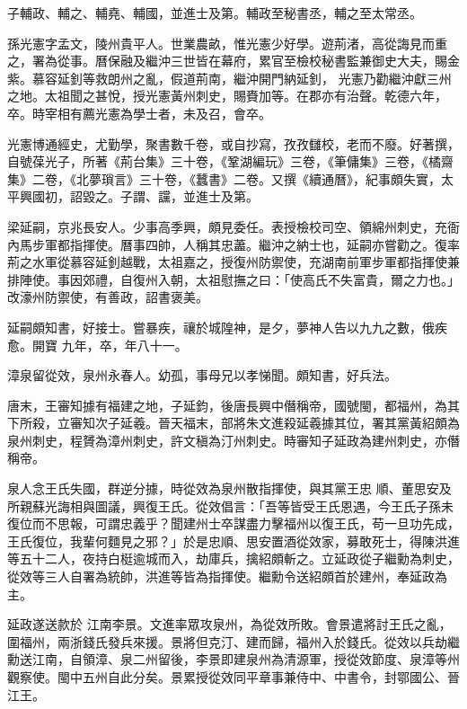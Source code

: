 \begin{pinyinscope}
 子輔政、輔之、輔堯、輔國，並進士及第。輔政至秘書丞，輔之至太常丞。



 孫光憲字孟文，陵州貴平人。世業農畝，惟光憲少好學。遊荊渚，高從誨見而重之，署為從事。曆保融及繼沖三世皆在幕府，累官至檢校秘書監兼御史大夫，賜金紫。慕容延釗等救朗州之亂，假道荊南，繼沖開門納延釗，
 光憲乃勸繼沖獻三州之地。太祖聞之甚悅，授光憲黃州刺史，賜賚加等。在郡亦有治聲。乾德六年，卒。時宰相有薦光憲為學士者，未及召，會卒。



 光憲博通經史，尤勤學，聚書數千卷，或自抄寫，孜孜讎校，老而不廢。好著撰，自號葆光子，所著《荊台集》三十卷，《鞏湖編玩》三卷，《筆傭集》三卷，《橘齋集》二卷，《北夢瑣言》三十卷，《蠶書》二卷。又撰《續通曆》，紀事頗失實，太平興國初，詔毀之。子謂、讜，並進士及第。



 梁延嗣，京兆長安人。少事高季興，頗見委任。表授檢校司空、領綿州刺史，充衙內馬步軍都指揮使。曆事四帥，人稱其忠藎。繼沖之納士也，延嗣亦嘗勸之。復率荊之水軍從慕容延釗越戰，太祖嘉之，授復州防禦使，充湖南前軍步軍都指揮使兼排陣使。事因郊禮，自復州入朝，太祖慰撫之曰：「使高氏不失富貴，爾之力也。」改濠州防禦使，有善政，詔書褒美。



 延嗣頗知書，好接士。嘗暴疾，禳於城隍神，是夕，夢神人告以九九之數，俄疾愈。開寶
 九年，卒，年八十一。



 漳泉留從效，泉州永春人。幼孤，事母兄以孝悌聞。頗知書，好兵法。



 唐末，王審知據有福建之地，子延鈞，後唐長興中僭稱帝，國號閩，都福州，為其下所殺，立審知次子延羲。晉天福末，部將朱文進殺延羲據其位，署其黨黃紹頗為泉州刺史，程贇為漳州刺史，許文稹為汀州刺史。時審知子延政為建州刺史，亦僭稱帝。



 泉人念王氏失國，群逆分據，時從效為泉州散指揮使，與其黨王忠
 順、董思安及所親蘇光誨相與圖議，興復王氏。從效倡言：「吾等皆受王氏恩遇，今王氏子孫未復位而不思報，可謂忠義乎？聞建州士卒謀盡力擊福州以復王氏，苟一旦功先成，王氏復位，我輩何麵見之邪？」於是忠順、思安置酒從效家，募敢死士，得陳洪進等五十二人，夜持白梃逾城而入，劫庫兵，擒紹頗斬之。立延政從子繼勳為刺史，從效等三人自署為統帥，洪進等皆為指揮使。繼勳令送紹頗首於建州，奉延政為主。



 延政遂送款於
 江南李景。文進率眾攻泉州，為從效所敗。會景遣將討王氏之亂，圍福州，兩浙錢氏發兵來援。景將但克汀、建而歸，福州入於錢氏。從效以兵劫繼勳送江南，自領漳、泉二州留後，李景即建泉州為清源軍，授從效節度、泉漳等州觀察使。閩中五州自此分矣。景累授從效同平章事兼侍中、中書令，封鄂國公、晉江王。




\end{pinyinscope}

